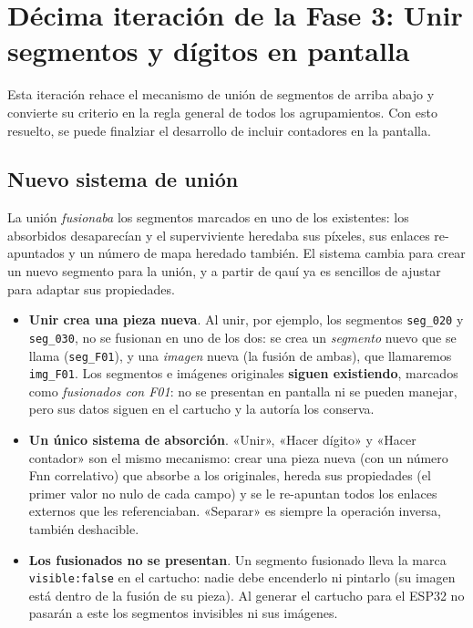 \section{Décima iteración de la Fase 3: Unir segmentos y dígitos en pantalla}
\label{sec:UnirSegmentos}

Esta iteración rehace el mecanismo de unión de segmentos de arriba abajo y
convierte su criterio en la regla general de todos los agrupamientos. Con esto resuelto, se puede finalziar el desarrollo de incluir contadores en la pantalla.

\subsection{Nuevo sistema de unión}

La unión \emph{fusionaba} los segmentos marcados en uno de los existentes: los
absorbidos desaparecían y el superviviente heredaba sus píxeles, sus enlaces
re-apuntados y un número de mapa heredado también. El sistema cambia para crear un nuevo segmento para la unión, y a partir de qauí ya es sencillos de ajustar para adaptar sus propiedades.

\begin{itemize}
	\item \textbf{Unir crea una pieza nueva}. Al unir, por ejemplo, los segmentos
	\texttt{seg\_020} y \texttt{seg\_030}, no se fusionan en uno de los dos: se crea un
	\emph{segmento} nuevo que se llama (\texttt{seg\_F01}), y una \emph{imagen} nueva (la fusión de ambas), que llamaremos \texttt{img\_F01}. Los
	segmentos e imágenes originales \textbf{siguen existiendo}, marcados como
	\emph{fusionados con F01}: no se presentan en pantalla ni se pueden manejar, pero sus datos 
	siguen en el cartucho y la autoría los conserva. 
	
	\item \textbf{Un único sistema de absorción}. «Unir», «Hacer dígito» y
	«Hacer contador» son el mismo mecanismo: crear una pieza nueva (con
	un número Fnn correlativo) que absorbe a los originales, hereda sus
	propiedades (el primer valor no nulo de cada campo) y se le re-apuntan
	todos los enlaces externos que les referenciaban. «Separar» es siempre la
	operación inversa, también deshacible.
	
	\item \textbf{Los fusionados no se presentan}. Un segmento fusionado lleva
	la marca \texttt{visible:false} en el cartucho: nadie debe encenderlo ni
	pintarlo (su imagen está dentro de la fusión de su pieza). Al generar el
	cartucho para el ESP32 no pasarán a este los segmentos invisibles ni sus imágenes.
\end{itemize}

